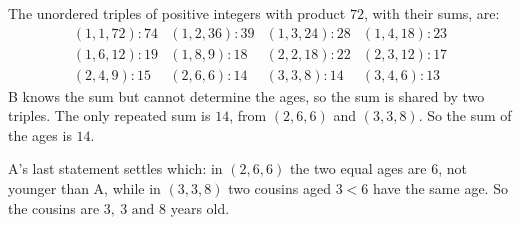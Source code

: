 The unordered triples of positive integers with product $72$, with their sums, are:
\[
\begin{array}{llll}
(1,1,72):74 & (1,2,36):39 & (1,3,24):28 & (1,4,18):23\\
(1,6,12):19 & (1,8,9):18 & (2,2,18):22 & (2,3,12):17\\
(2,4,9):15 & (2,6,6):14 & (3,3,8):14 & (3,4,6):13
\end{array}
\]
B knows the sum but cannot determine the ages, so the sum is shared by two triples. The only repeated sum is $14$, from $(2,6,6)$ and $(3,3,8)$. So the sum of the ages is $\boxed{14}$.

A's last statement settles which: in $(2,6,6)$ the two equal ages are $6$, not younger than A, while in $(3,3,8)$ two cousins aged $3<6$ have the same age. So the cousins are $\boxed{3,\ 3\text{ and }8}$ years old.
